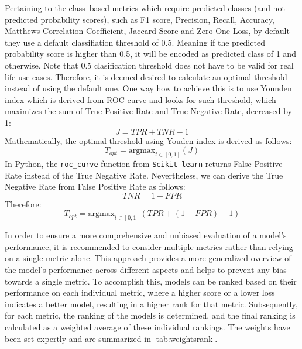 Pertaining to the class--based metrics which require predicted classes (and not predicted probability scores), such as F1 score, Precision, Recall, Accuracy, Matthews Correlation Coefficient, Jaccard Score and Zero-One Loss, by default they use a default classifiation threshold of 0.5.
Meaning if the predicted probability score is higher than 0.5, it will be encoded as predicted class of 1 and otherwise. 
Note that 0.5 clasification threshold does not have to be valid for real life use cases. Therefore, it is deemed desired to calculate an optimal threshold instead of using the default one.
One way how to achieve this is to use Younden index which is derived from ROC curve and looks for such threshold, which maximizes the sum of True Positive Rate and True Negative Rate, decreased by 1:
\begin{equation}\label{eq}
J = TPR + TNR - 1
\end{equation}
Mathematically, the optimal threshold using Youden index is derived as follows:
\begin{equation}\label{eq}
    T_{opt} = \text{argmax}_{t \in [0, 1]}\left(J\right)
\end{equation}
In Python, the \lstinline{roc_curve} function from \lstinline{Scikit-learn} returns False Positive Rate instead of the True Negative Rate. Nevertheless, we can derive the True Negative Rate from False Positive Rate as follows:
\begin{equation}\label{eq}
    TNR =  1-FPR
\end{equation}
Therefore:
\begin{equation}\label{eq}
    T_{opt} = \text{argmax}_{t \in [0, 1]}\left(TPR +  \left(1-FPR\right) - 1\right)
\end{equation}

In order to ensure a more comprehensive and unbiased evaluation of a model's performance, it is recommended to consider multiple metrics rather than relying on a single metric alone. This approach provides a more generalized overview of the model's performance across different aspects and helps to prevent any bias towards a single metric.
To accomplish this, models can be ranked based on their performance on each individual metric, where a higher score or a lower loss indicates a better model, resulting in a higher rank for that metric. Subsequently, for each metric, the ranking of the models is determined, and the final ranking is calculated as a weighted average of these individual rankings.
The weights have been set expertly and are summarized in \autoref{tab:weightsrank}.

